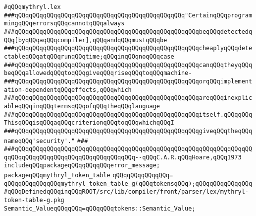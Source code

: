 \label{src/lib/compiler/front/parser/lex/mythryl.lex}
\verb|#qQQqmythryl.lex|\newline
\newline
\newline
\newline
\verb|###qQQqqQQqqQQqqQQqqQQqqQQqqQQqqQQqqQQqqQQqqQQqqQQq"CertainqQQqprogrammingqQQqerrorsqQQqcannotqQQqalways|\newline
\verb|###qQQqqQQqqQQqqQQqqQQqqQQqqQQqqQQqqQQqqQQqqQQqqQQqqQQqbeqQQqdetectedqQQq[byqQQqaqQQqcompiler],qQQqandqQQqmustqQQqbe|\newline
\verb|###qQQqqQQqqQQqqQQqqQQqqQQqqQQqqQQqqQQqqQQqqQQqqQQqqQQqcheaplyqQQqdetectableqQQqatqQQqrunqQQqtime;qQQqinqQQqnoqQQqcase|\newline
\verb|###qQQqqQQqqQQqqQQqqQQqqQQqqQQqqQQqqQQqqQQqqQQqqQQqqQQqcanqQQqtheyqQQqbeqQQqallowedqQQqtoqQQqgiveqQQqriseqQQqtoqQQqmachine-|\newline
\verb|###qQQqqQQqqQQqqQQqqQQqqQQqqQQqqQQqqQQqqQQqqQQqqQQqqQQqorqQQqimplementation-dependentqQQqeffects,qQQqwhich|\newline
\verb|###qQQqqQQqqQQqqQQqqQQqqQQqqQQqqQQqqQQqqQQqqQQqqQQqqQQqareqQQqinexplicableqQQqinqQQqtermsqQQqofqQQqtheqQQqlanguage|\newline
\verb|###qQQqqQQqqQQqqQQqqQQqqQQqqQQqqQQqqQQqqQQqqQQqqQQqqQQqitself.qQQqqQQqThisqQQqisqQQqaqQQqcriterionqQQqtoqQQqwhichqQQqI|\newline
\verb|###qQQqqQQqqQQqqQQqqQQqqQQqqQQqqQQqqQQqqQQqqQQqqQQqqQQqgiveqQQqtheqQQqnameqQQq'security'."|\newline
\verb|###|\newline
\verb|###qQQqqQQqqQQqqQQqqQQqqQQqqQQqqQQqqQQqqQQqqQQqqQQqqQQqqQQqqQQqqQQqqQQqqQQqqQQqqQQqqQQqqQQqqQQqqQQqqQQqqQQq--qQQqC.A.R.qQQqHoare,qQQq1973|\newline
\newline
\newline
\newline
\verb|includeqQQqpackageqQQqqQQqqQQqerror_message;|\newline
\newline
\verb|packageqQQqmythryl_token_table|\newline
\verb|qQQqqQQqqQQqqQQq=|\newline
\verb|qQQqqQQqqQQqqQQqmythryl_token_table_g(qQQqtokensqQQq);qQQqqQQqqQQqqQQq#qQQqDefinedqQQqinqQQqROOT/src/lib/compiler/front/parser/lex/mythryl-token-table-g.pkg|\newline
\newline
\verb|Semantic_ValueqQQqqQQq=qQQqqQQqtokens::Semantic_Value;|\newline
